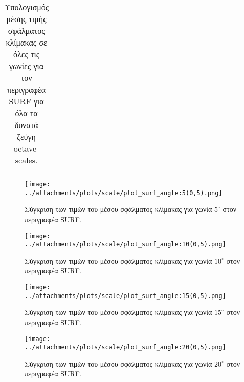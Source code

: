 \begin{table}[htbp]
\begin{tabular}{c|ccccccccc|}
 \end{tabular}
  \caption{Υπολογισμός μέσης τιμής σφάλματος κλίμακας σε όλες τις γωνίες για τον περιγραφέα SURF για όλα τα δυνατά ζεύγη octave-scales.}
 \label{table:all_corner_surf1}

\end{table}
 
     
\newpage

\begin{figure}[ht!]
\begin{minipage}[b]{1.0\linewidth}
\centering
\texttt{[image: ../attachments/plots/scale/plot\_surf\_angle:5(0,5).png]}
\caption{Σύγκριση των τιμών του μέσου σφάλματος κλίμακας για γωνία $5^{\circ}$ στον περιγραφέα SURF.}
\label{fig:corner_surf_5}
\end{minipage}
\end{figure}
\begin{figure}[ht!]
\begin{minipage}[b]{1.0\linewidth}
\centering
\texttt{[image: ../attachments/plots/scale/plot\_surf\_angle:10(0,5).png]}
\caption{Σύγκριση των τιμών του μέσου σφάλματος κλίμακας για γωνία $10^{\circ}$ στον περιγραφέα SURF.}
\label{fig:corner_surf_10}
\end{minipage}
\end{figure}

 \newpage
 

\begin{figure}[ht!]
\begin{minipage}[b]{1.0\linewidth}
\centering
\texttt{[image: ../attachments/plots/scale/plot\_surf\_angle:15(0,5).png]}
\caption{Σύγκριση των τιμών του μέσου σφάλματος κλίμακας για γωνία $15^{\circ}$ στον περιγραφέα SURF.}
\label{fig:corner_surf_15}
\end{minipage}
\end{figure}
\begin{figure}[ht!]
\begin{minipage}[b]{1.0\linewidth}
\centering
\texttt{[image: ../attachments/plots/scale/plot\_surf\_angle:20(0,5).png]}
\caption{Σύγκριση των τιμών του μέσου σφάλματος κλίμακας για γωνία $20^{\circ}$ στον περιγραφέα SURF.}
\label{fig:corner_surf_20}
\end{minipage}
\end{figure}
 \newpage

